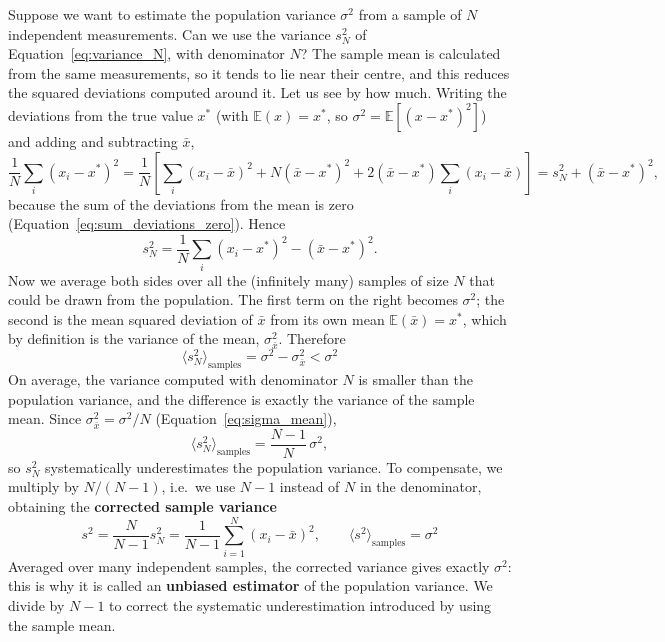 \documentclass[letterpaper,11pt,leqno]{book}
\begin{document}
Suppose we want to estimate the population variance $\sigma^2$ from a sample of $N$ independent measurements. Can we use the variance $s_N^2$ of Equation~\eqref{eq:variance_N}, with denominator $N$? The sample mean is calculated from the same measurements, so it tends to lie near their centre, and this reduces the squared deviations computed around it. Let us see by how much. Writing the deviations from the true value $x^*$ (with $\mathbb{E}(x) = x^*$, so $\sigma^2 = \mathbb{E}[(x - x^*)^2]$) and adding and subtracting $\bar{x}$,
\begin{equation*}
\frac{1}{N}\sum_i(x_i - x^*)^2 = \frac{1}{N}\left[\sum_i(x_i - \bar{x})^2 + N(\bar{x} - x^*)^2 + 2(\bar{x} - x^*)\sum_i(x_i - \bar{x})\right] = s_N^2 + (\bar{x} - x^*)^2,
\end{equation*}
because the sum of the deviations from the mean is zero (Equation~\eqref{eq:sum_deviations_zero}). Hence
\begin{equation*}
s_N^2 = \frac{1}{N}\sum_i(x_i - x^*)^2 - (\bar{x} - x^*)^2.
\end{equation*}
Now we average both sides over all the (infinitely many) samples of size $N$ that could be drawn from the population. The first term on the right becomes $\sigma^2$; the second is the mean squared deviation of $\bar{x}$ from its own mean $\mathbb{E}(\bar{x}) = x^*$, which by definition is the variance of the mean, $\sigma_{\bar{x}}^2$. Therefore
\begin{equation}
\boxed{\langle s_N^2\rangle_{\text{samples}} = \sigma^2 - \sigma_{\bar{x}}^2 < \sigma^2}
\label{eq:sample_variance_bias}
\end{equation}
On average, the variance computed with denominator $N$ is smaller than the population variance, and the difference is exactly the variance of the sample mean. Since $\sigma_{\bar{x}}^2 = \sigma^2/N$ (Equation~\eqref{eq:sigma_mean}),
\begin{equation}
\langle s_N^2\rangle_{\text{samples}} = \frac{N - 1}{N}\,\sigma^2,
\end{equation}
so $s_N^2$ systematically underestimates the population variance. To compensate, we multiply by $N/(N - 1)$, i.e.\ we use $N - 1$ instead of $N$ in the denominator, obtaining the \textbf{corrected sample variance}
\begin{equation}
\boxed{s^2 = \frac{N}{N - 1}s_N^2 = \frac{1}{N - 1}\sum_{i=1}^{N}(x_i - \bar{x})^2, \qquad \langle s^2\rangle_{\text{samples}} = \sigma^2}
\label{eq:corrected_sample_variance}
\end{equation}
Averaged over many independent samples, the corrected variance gives exactly $\sigma^2$: this is why it is called an \textbf{unbiased estimator} of the population variance. We divide by $N - 1$ to correct the systematic underestimation introduced by using the sample mean.
\end{document}
